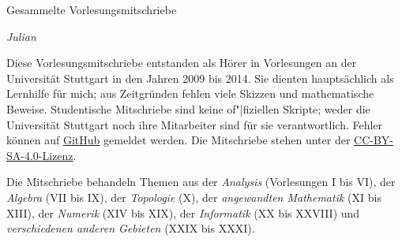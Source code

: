 
\ihead{\leftmark}
\ifoot{\vspace{-1.5mm}\rightmark}

\thispagestyle{empty}
\vspace*{1em}

{%
  \huge%
  Gesammelte Vorlesungsmitschriebe%
}
\vspace*{1em}

\emph{Julian }

\vspace*{1em}

Diese Vorlesungsmitschriebe entstanden als Hörer in Vorlesungen
an der Universität Stuttgart in den Jahren 2009 bis 2014.
Sie dienten hauptsächlich als Lernhilfe für mich;
aus Zeitgründen fehlen viele Skizzen und mathematische Beweise.
Studentische Mitschriebe sind keine of"|fiziellen Skripte;
weder die Universität Stuttgart noch ihre Mitarbeiter sind für sie verantwortlich.
Fehler können auf \href{https://github.com/valentjn/class-notes}{GitHub} gemeldet werden.
Die Mitschriebe stehen unter der
\href{https://creativecommons.org/licenses/by-sa/4.0/}{CC-BY-SA-4.0-Lizenz}.

Die Mitschriebe behandeln Themen aus
der \emph{Analysis} (Vorlesungen I bis VI),
der \emph{Algebra} (VII bis IX),
der \emph{Topologie} (X),
der \emph{angewandten Mathematik} (XI bis XIII),
der \emph{Numerik} (XIV bis XIX),
der \emph{Informatik} (XX bis XXVIII) und
\emph{verschiedenen anderen Gebieten} (XXIX bis XXXI).

{%
  \setcounter{tocdepth}{\parttocdepth}


  \makeatletter
  \renewcommand*{\@pnumwidth}{2.7em}
  \renewcommand*{\@tocrmarg}{2.7em}
  \makeatother

  \renewcommand*{\contentsname}{Vorlesungen}
  \tableofcontents%
}

\pagebreak

{%
  \manualmark{}


  \setcounter{tocdepth}{\subsubsectiontocdepth}

  \tableofcontents%
}

\pagebreak



